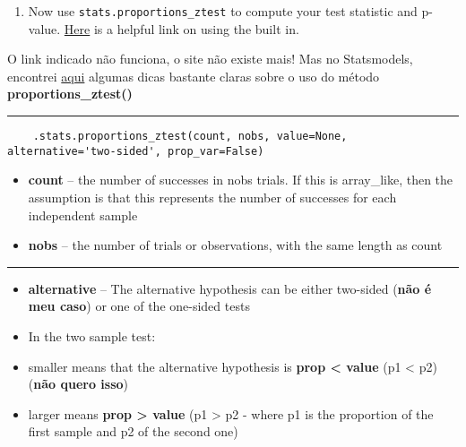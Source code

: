 \documentclass[11pt]{article}
\providecommand{\tightlist}{%
      \setlength{\itemsep}{0pt}\setlength{\parskip}{0pt}}
\begin{document}
    \begin{enumerate}
\def\labelenumi{\alph{enumi}.}
\setcounter{enumi}{12}
\tightlist
\item
  Now use \texttt{stats.proportions\_ztest} to compute your test
  statistic and p-value.
  \href{http://knowledgetack.com/python/statsmodels/proportions_ztest/}{Here}
  is a helpful link on using the built in.
\end{enumerate}

    O link indicado não funciona, o site não existe mais! Mas no
Statsmodels, encontrei
\href{https://www.statsmodels.org/dev/generated/statsmodels.stats.proportion.proportions_ztest.html}{aqui}
algumas dicas bastante claras sobre o uso do método
\textbf{proportions\_ztest()}

\begin{center}\rule{0.5\linewidth}{\linethickness}\end{center}

\begin{verbatim}
    .stats.proportions_ztest(count, nobs, value=None, alternative='two-sided', prop_var=False)
\end{verbatim}

\begin{itemize}
\item
  \textbf{count} -- the number of successes in nobs trials. If this is
  array\_like, then the assumption is that this represents the number of
  successes for each independent sample
\item
  \textbf{nobs} -- the number of trials or observations, with the same
  length as count
\end{itemize}

\begin{center}\rule{0.5\linewidth}{\linethickness}\end{center}

\begin{itemize}
\item
  \textbf{alternative} -- The alternative hypothesis can be either
  two-sided (\textbf{não é meu caso}) or one of the one-sided tests
\item
  In the two sample test:
\item
  smaller means that the alternative hypothesis is \textbf{prop
  \textless{} value} (p1 \textless{} p2) (\textbf{não quero isso})
\item
  larger means \textbf{prop \textgreater{} value} (p1 \textgreater{} p2
  - where p1 is the proportion of the first sample and p2 of the second
  one)
\end{itemize}
\end{document}

